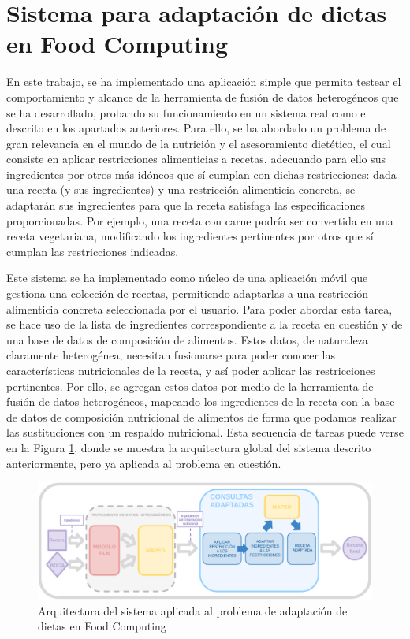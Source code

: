 \section{Sistema para adaptación de dietas en Food Computing}

En este trabajo, se ha implementado una aplicación simple que permita testear el comportamiento y alcance de la herramienta de fusión de datos heterogéneos que se ha desarrollado, probando su funcionamiento en un sistema real como el descrito en los apartados anteriores. Para ello, se ha abordado un problema de gran relevancia en el mundo de la nutrición y el asesoramiento dietético, el cual consiste en aplicar restricciones alimenticias a recetas, adecuando para ello sus ingredientes por otros más idóneos que sí cumplan con dichas restricciones: dada una receta (y sus ingredientes) y una restricción alimenticia concreta, se adaptarán sus ingredientes para que la receta satisfaga las especificaciones proporcionadas. Por ejemplo, una receta con carne podría ser convertida en una receta vegetariana, modificando los ingredientes pertinentes por otros que sí cumplan las restricciones indicadas.

Este sistema se ha implementado como núcleo de una aplicación móvil que gestiona una colección de recetas, permitiendo adaptarlas a una restricción alimenticia concreta seleccionada por el usuario. Para poder abordar esta tarea, se hace uso de la lista de ingredientes correspondiente a la receta en cuestión y de una base de datos de composición de alimentos. Estos datos, de naturaleza claramente heterogénea, necesitan fusionarse para poder conocer las características nutricionales de la receta, y así poder aplicar las restricciones pertinentes. Por ello, se agregan estos datos por medio de la herramienta de fusión de datos heterogéneos, mapeando los ingredientes de la receta con la base de datos de composición nutricional de alimentos de forma que podamos realizar las sustituciones con un respaldo nutricional. Esta secuencia de tareas puede verse en la Figura \ref{fig:arq_application_food_comp}, donde se muestra la arquitectura global del sistema descrito anteriormente, pero ya aplicada al problema en cuestión.

\begin{figure}[H]
    \centering
    \includegraphics[width=1.0\textwidth]{imagenes/arquitectura/arquitectura-fcomputing.png}
    \caption{Arquitectura del sistema aplicada al problema de adaptación de dietas en Food Computing}
    \label{fig:arq_application_food_comp}
\end{figure}

